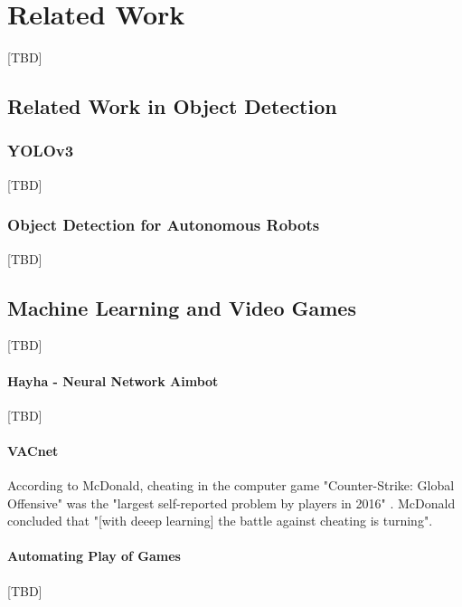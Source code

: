 \chapter{Related Work}
[TBD]

\section{Related Work in Object Detection}
\subsection{YOLOv3}
[TBD]\cite{yolov3}

\subsection{Object Detection for Autonomous Robots}
[TBD]\cite{Schweitzer2017}


\section{Machine Learning and Video Games}
[TBD]
\subsubsection{Hayha - Neural Network Aimbot}
[TBD]\cite{Hayha}

\subsubsection{VACnet}
According to McDonald, cheating in the computer game "Counter-Strike: Global Offensive" was the "largest self-reported problem by players in 2016" \cite{VACnet}. McDonald concluded that "[with deeep learning] the battle against cheating is turning".


\subsubsection{Automating Play of Games}
[TBD]\cite{Tom13thefirst}\cite{Togelius09supermario} %